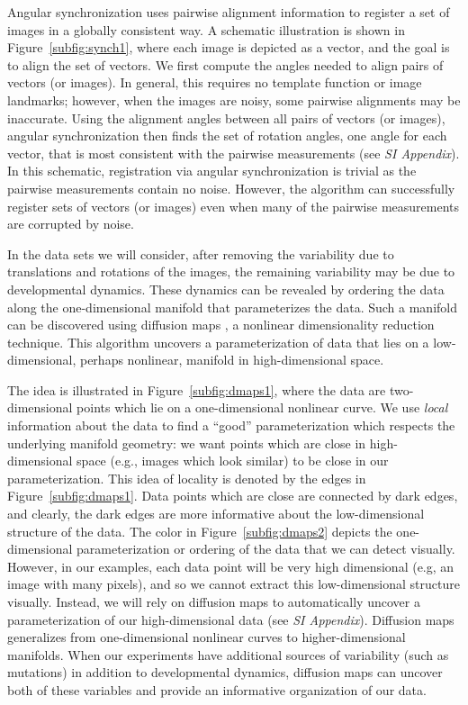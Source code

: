 \documentclass{pnastwo}
\begin{document}
\begin{article}
Angular synchronization uses pairwise alignment information to register a set of images in a globally consistent way.
%
A schematic illustration is shown in Figure~\ref{subfig:synch1}, where each image is depicted as a vector, and the goal is to align the set of vectors. 
%
We first compute the angles needed to align pairs of vectors (or images).
%
In general, this requires no template function or image landmarks; however, when the images are noisy, some pairwise alignments may be inaccurate.
%
Using the alignment angles between all pairs of vectors (or images), angular synchronization then finds the set of rotation angles, one angle for each vector, that is most consistent with the pairwise measurements (see {\it SI Appendix}). 
%
In this schematic, registration via angular synchronization is trivial as the pairwise measurements contain no noise. 
%
However, the algorithm can successfully register sets of vectors (or images) even when many of the pairwise measurements are corrupted by noise. 
%

%
In the data sets we will consider, after removing the variability due to translations and rotations of the images, the remaining variability may be due to developmental dynamics.
% 
These dynamics can be revealed by ordering the data along the one-dimensional manifold that parameterizes the data. 
%
Such a manifold can be discovered using diffusion maps \cite{coifman2005geometric}, a nonlinear dimensionality reduction technique.
%
This algorithm uncovers a parameterization of data that lies on a low-dimensional, perhaps nonlinear, manifold in high-dimensional space. 
%

The idea is illustrated in Figure~\ref{subfig:dmaps1}, where the data are two-dimensional points which lie on a one-dimensional nonlinear curve. 
%
We use {\it local} information about the data to find a ``good'' parameterization which respects the underlying manifold geometry: we want points which are close in high-dimensional space (e.g., images which look similar) to be close in our parameterization.
%
This idea of locality is denoted by the edges in Figure~\ref{subfig:dmaps1}.
%
Data points which are close are connected by dark edges, and clearly, the dark edges are more informative about the low-dimensional structure of the data. 
%
The color in Figure~\ref{subfig:dmaps2} depicts the one-dimensional parameterization or ordering of the data that we can detect visually.
%
However, in our examples, each data point will be very high dimensional (e.g, an image with many pixels), and so we cannot extract this low-dimensional structure visually.
%
Instead, we will rely on diffusion maps to automatically uncover a parameterization of our high-dimensional data (see {\it SI Appendix}).
%
Diffusion maps generalizes from one-dimensional nonlinear curves to higher-dimensional manifolds. 
%
When our experiments have additional sources of variability (such as mutations) in addition to developmental dynamics, diffusion maps can uncover both of these variables and provide an informative organization of our data. %


\end{article}
\end{document}
